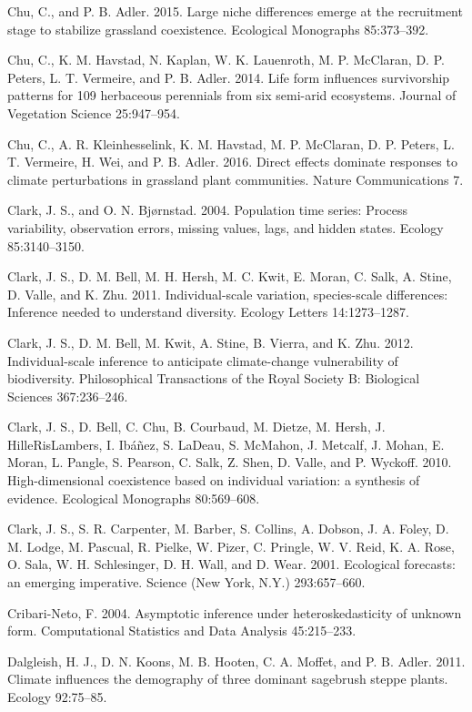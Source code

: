 \documentclass[12pt,]{article}
\begin{document}
Chu, C., and P. B. Adler. 2015. Large niche differences emerge at the
recruitment stage to stabilize grassland coexistence. Ecological
Monographs 85:373--392.

Chu, C., K. M. Havstad, N. Kaplan, W. K. Lauenroth, M. P. McClaran, D.
P. Peters, L. T. Vermeire, and P. B. Adler. 2014. Life form influences
survivorship patterns for 109 herbaceous perennials from six semi-arid
ecosystems. Journal of Vegetation Science 25:947--954.

Chu, C., A. R. Kleinhesselink, K. M. Havstad, M. P. McClaran, D. P.
Peters, L. T. Vermeire, H. Wei, and P. B. Adler. 2016. Direct effects
dominate responses to climate perturbations in grassland plant
communities. Nature Communications 7.

Clark, J. S., and O. N. Bj{ø}rnstad. 2004. Population time series:
Process variability, observation errors, missing values, lags, and
hidden states. Ecology 85:3140--3150.

Clark, J. S., D. M. Bell, M. H. Hersh, M. C. Kwit, E. Moran, C. Salk, A.
Stine, D. Valle, and K. Zhu. 2011. Individual-scale variation,
species-scale differences: Inference needed to understand diversity.
Ecology Letters 14:1273--1287.

Clark, J. S., D. M. Bell, M. Kwit, A. Stine, B. Vierra, and K. Zhu.
2012. Individual-scale inference to anticipate climate-change
vulnerability of biodiversity. Philosophical Transactions of the Royal
Society B: Biological Sciences 367:236--246.

Clark, J. S., D. Bell, C. Chu, B. Courbaud, M. Dietze, M. Hersh, J.
HilleRisLambers, I. Ib{á}{ñ}ez, S. LaDeau, S. McMahon, J. Metcalf, J.
Mohan, E. Moran, L. Pangle, S. Pearson, C. Salk, Z. Shen, D. Valle, and
P. Wyckoff. 2010. High-dimensional coexistence based on individual
variation: a synthesis of evidence. Ecological Monographs 80:569--608.

Clark, J. S., S. R. Carpenter, M. Barber, S. Collins, A. Dobson, J. A.
Foley, D. M. Lodge, M. Pascual, R. Pielke, W. Pizer, C. Pringle, W. V.
Reid, K. A. Rose, O. Sala, W. H. Schlesinger, D. H. Wall, and D. Wear.
2001. Ecological forecasts: an emerging imperative. Science (New York,
N.Y.) 293:657--660.

Cribari-Neto, F. 2004. Asymptotic inference under heteroskedasticity of
unknown form. Computational Statistics and Data Analysis 45:215--233.

Dalgleish, H. J., D. N. Koons, M. B. Hooten, C. A. Moffet, and P. B.
Adler. 2011. Climate influences the demography of three dominant
sagebrush steppe plants. Ecology 92:75--85.
\end{document}

